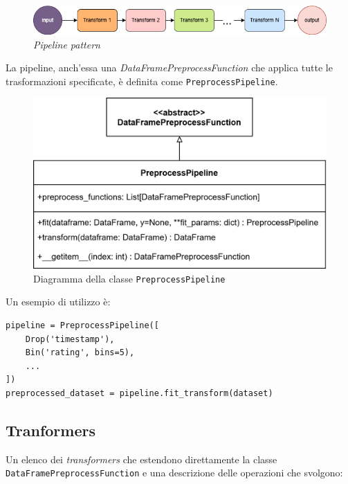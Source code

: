 \begin{figure}[H]
    \centering
    \includegraphics[scale=0.45]{figures/pipeline.png}
    \caption{\textit{Pipeline pattern}}
    \label{fig:pipeline}
\end{figure}

La pipeline, anch'essa una \textit{DataFramePreprocessFunction} che applica tutte le trasformazioni specificate, è definita come \texttt{PreprocessPipeline}.

\begin{figure}[H]
    \centering
    \includegraphics[scale=0.2]{figures/UML/preprocessing/preprocess_pipeline.png}
    \caption{Diagramma della classe \texttt{PreprocessPipeline}}
    \label{fig:preprocess_pipeline}
\end{figure}

Un esempio di utilizzo è:

\begin{lstlisting}[caption=esempio di utilizzo di \texttt{PreprocessPipeline}]
pipeline = PreprocessPipeline([
    Drop('timestamp'),
    Bin('rating', bins=5),
    ...
])
preprocessed_dataset = pipeline.fit_transform(dataset) 
\end{lstlisting}

\subsection{Tranformers}

Un elenco dei \textit{transformers} che estendono direttamente la classe \\
\texttt{DataFramePreprocessFunction} e una descrizione delle operazioni che svolgono:

